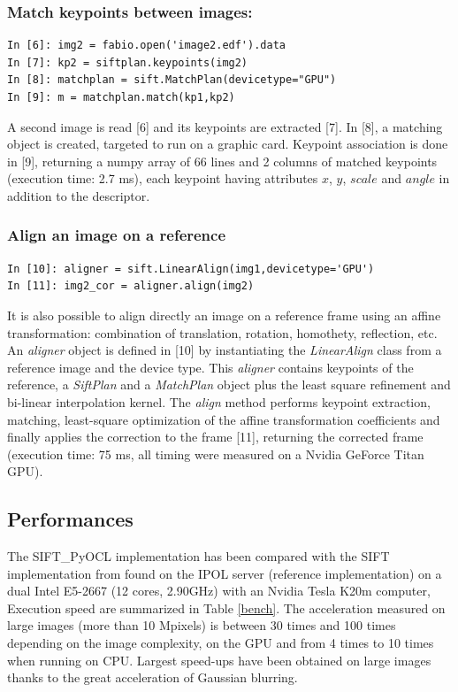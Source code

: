 \documentclass[preprint]{iucr}
\begin{document}
\subsubsection{Match keypoints between images:}
\begin{verbatim}
In [6]: img2 = fabio.open('image2.edf').data
In [7]: kp2 = siftplan.keypoints(img2)
In [8]: matchplan = sift.MatchPlan(devicetype="GPU")
In [9]: m = matchplan.match(kp1,kp2)
\end{verbatim}
A second image is read [6] and its keypoints are extracted [7].
In [8], a matching object is created, targeted to run on a graphic card.
Keypoint association is done in [9], returning a numpy array of 66 lines and 2
columns of matched keypoints (execution time: 2.7 ms), each keypoint having
attributes $x$, $y$, $scale$ and $angle$ in addition to the descriptor.

\subsubsection{Align an image on a reference}
\begin{verbatim}
In [10]: aligner = sift.LinearAlign(img1,devicetype='GPU')
In [11]: img2_cor = aligner.align(img2)
\end{verbatim}
It is also possible to align directly an image on a reference frame using an
affine transformation: combination of translation, rotation, homothety,
reflection, etc.
An \emph{aligner} object is defined in [10] by instantiating the
\emph{LinearAlign} class from a reference image and the device type.
This \emph{aligner} contains keypoints of the
reference, a \emph{SiftPlan} and a \emph{MatchPlan} object plus the least square
refinement and bi-linear interpolation kernel.
The \emph{align} method performs keypoint extraction, matching, least-square
optimization of the affine transformation coefficients and finally applies the
correction to the frame [11], returning the corrected frame (execution time:
75 ms, all timing were measured on a Nvidia GeForce Titan GPU).

\subsection{Performances}

The SIFT\_PyOCL implementation has been compared with the SIFT
implementation from \cite{ASIFT} found on the IPOL server (reference
implementation) on a dual Intel E5-2667 (12 cores, 2.90GHz) with an Nvidia Tesla
K20m computer, Execution speed are summarized in Table \ref{bench}.
The acceleration measured on large images (more than 10 Mpixels) is between 30
times and 100 times depending on the image complexity, on the GPU and from 4
times to 10 times when running on CPU.
Largest speed-ups have been obtained on large images thanks to the
great acceleration of Gaussian blurring.
\end{document}
